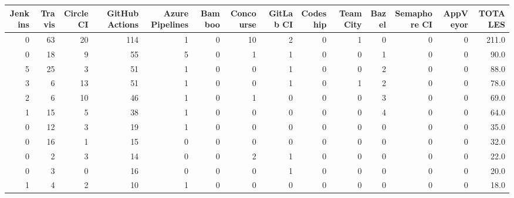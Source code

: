 \begin{tabular}{rrrrrrrrrrrrrr}
\toprule
 Jenkins &  Travis &  Circle CI &  GitHub Actions &  Azure Pipelines &  Bamboo &  Concourse &  GitLab CI &  Codeship &  TeamCity &  Bazel &  Semaphore CI &  AppVeyor &  TOTALES \\
\midrule
       0 &      63 &         20 &             114 &                1 &       0 &         10 &          2 &         0 &         1 &      0 &             0 &         0 &    211.0 \\
       0 &      18 &          9 &              55 &                5 &       0 &          1 &          1 &         0 &         0 &      1 &             0 &         0 &     90.0 \\
       5 &      25 &          3 &              51 &                1 &       0 &          0 &          1 &         0 &         0 &      2 &             0 &         0 &     88.0 \\
       3 &       6 &         13 &              51 &                1 &       0 &          0 &          1 &         0 &         1 &      2 &             0 &         0 &     78.0 \\
       2 &       6 &         10 &              46 &                1 &       0 &          1 &          0 &         0 &         0 &      3 &             0 &         0 &     69.0 \\
       1 &      15 &          5 &              38 &                1 &       0 &          0 &          0 &         0 &         0 &      4 &             0 &         0 &     64.0 \\
       0 &      12 &          3 &              19 &                1 &       0 &          0 &          0 &         0 &         0 &      0 &             0 &         0 &     35.0 \\
       0 &      16 &          1 &              15 &                0 &       0 &          0 &          0 &         0 &         0 &      0 &             0 &         0 &     32.0 \\
       0 &       2 &          3 &              14 &                0 &       0 &          2 &          1 &         0 &         0 &      0 &             0 &         0 &     22.0 \\
       0 &       3 &          0 &              16 &                0 &       0 &          0 &          1 &         0 &         0 &      0 &             0 &         0 &     20.0 \\
       1 &       4 &          2 &              10 &                1 &       0 &          0 &          0 &         0 &         0 &      0 &             0 &         0 &     18.0 \\

\end{tabular}
